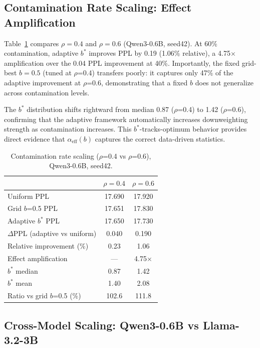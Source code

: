\documentclass[11pt]{article}
\begin{document}
\subsection{Contamination Rate Scaling: Effect Amplification}
\label{sec:rho_scaling}

Table~\ref{tab:rho_scaling} compares $\rho=0.4$ and $\rho=0.6$ (Qwen3-0.6B, seed42). At 60\% contamination, adaptive $b^*$ improves PPL by 0.19 (1.06\% relative), a 4.75$\times$ amplification over the 0.04 PPL improvement at 40\%. Importantly, the fixed grid-best $b=0.5$ (tuned at $\rho$=0.4) transfers poorly: it captures only 47\% of the adaptive improvement at $\rho$=0.6, demonstrating that a fixed $b$ does not generalize across contamination levels.

The $b^*$ distribution shifts rightward from median 0.87 ($\rho$=0.4) to 1.42 ($\rho$=0.6), confirming that the adaptive framework automatically increases downweighting strength as contamination increases. This $b^*$-tracks-optimum behavior provides direct evidence that $\alpha_{\mathrm{eff}}(b)$ captures the correct data-driven statistics.

\begin{table}[t]
\centering
\caption{Contamination rate scaling ($\rho$=0.4 vs $\rho$=0.6), Qwen3-0.6B, seed42.}
\label{tab:rho_scaling}
\small
\begin{tabular}{l cc}
\toprule
& $\rho=0.4$ & $\rho=0.6$ \\
\midrule
Uniform PPL & 17.690 & 17.920 \\
Grid $b$=0.5 PPL & 17.651 & 17.830 \\
Adaptive $b^*$ PPL & 17.650 & 17.730 \\
\midrule
$\Delta$PPL (adaptive vs uniform) & 0.040 & 0.190 \\
Relative improvement (\%) & 0.23 & 1.06 \\
Effect amplification & --- & 4.75$\times$ \\
\midrule
$b^*$ median & 0.87 & 1.42 \\
$b^*$ mean & 1.40 & 2.08 \\
Ratio vs grid $b$=0.5 (\%) & 102.6 & 111.8 \\
\bottomrule
\end{tabular}
\end{table}

\subsection{Cross-Model Scaling: Qwen3-0.6B vs Llama-3.2-3B}
\label{sec:cross_model}
\end{document}
